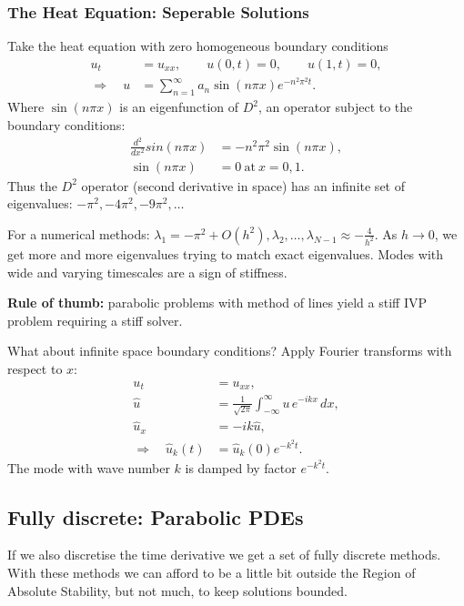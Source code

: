 \documentclass[12pt, a4paper]{article}
\theoremstyle{definition}
\theoremstyle{remark}
\numberwithin{equation}{section}
\begin{document}
\subsubsection{The Heat Equation: Seperable Solutions}
Take the heat equation with zero homogeneous boundary conditions
\begin{align*}
u_t &= u_{xx}, \qquad u(0,t) = 0, \qquad u(1,t) = 0, \\
\Longrightarrow \quad u &= \sum_{n=1}^\infty a_n \sin(n\pi x) e^{-n^2 \pi^2 t}.
\end{align*}
Where $\sin(n\pi x)$ is an eigenfunction of $D^2$, an operator subject to
the boundary conditions:
\begin{align*}
\frac{d^2}{d x^2} sin(n\pi x) &= -n^2 \pi^2 \sin(n\pi x) ,\\
\sin(n\pi x) & = 0\ \mathrm{at}\ x=0,1.
\end{align*}
Thus the $D^2$ operator (second derivative in space)
has an infinite set of eigenvalues: $-\pi^2, -4\pi^2, -9\pi^2, \ldots$


For a numerical methods: $\lambda_1 = -\pi^2 + O(h^2), \lambda_2, \ldots, \lambda_{N-1} \approx -\frac{4}{h^2}$.
As $h \rightarrow 0$, we get more and more eigenvalues trying to match exact
eigenvalues. Modes with wide and varying timescales are a sign of stiffness.


{\bf Rule of thumb:} parabolic problems with method of lines yield a stiff IVP
problem requiring a stiff solver.


What about infinite space boundary conditions? Apply Fourier transforms with
respect to $x$:
\begin{align*}
u_t &= u_{xx},\\
\hat{u} &= \frac{1}{\sqrt{2\pi}} \int_{-\infty}^\infty u \, e^{-ikx}\, dx, \\
\hat{u}_x &= -ik\hat{u}, \\
\Longrightarrow \quad \hat{u}_k(t) &= \hat{u}_k(0)e^{-k^2 t}.
\end{align*}
The mode with wave number $k$ is damped by factor $e^{-k^2 t}$.






\newpage
\subsection{Fully discrete: Parabolic PDEs}

If we also discretise the time derivative we get a set of fully discrete methods.
With these methods we can afford to be a little bit outside the Region of Absolute Stability, but not much, to keep solutions bounded.
\end{document}
